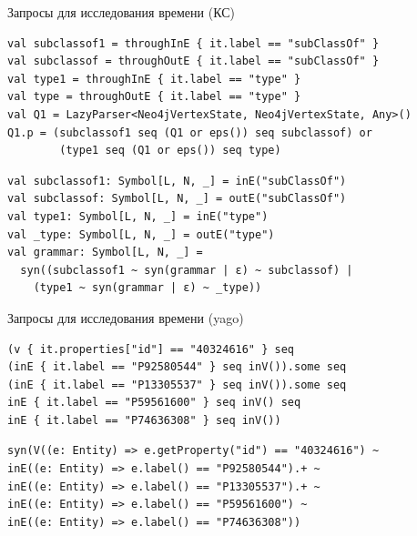\documentclass[aspectratio=169]{beamer}
\begin{document}
\begin{frame}[fragile]{Запросы для исследования времени (КС)}
  \begin{verbatim}
val subclassof1 = throughInE { it.label == "subClassOf" }
val subclassof = throughOutE { it.label == "subClassOf" }
val type1 = throughInE { it.label == "type" }
val type = throughOutE { it.label == "type" }
val Q1 = LazyParser<Neo4jVertexState, Neo4jVertexState, Any>()
Q1.p = (subclassof1 seq (Q1 or eps()) seq subclassof) or
        (type1 seq (Q1 or eps()) seq type)
\end{verbatim}
  \begin{verbatim}
val subclassof1: Symbol[L, N, _] = inE("subClassOf")
val subclassof: Symbol[L, N, _] = outE("subClassOf")
val type1: Symbol[L, N, _] = inE("type")
val _type: Symbol[L, N, _] = outE("type")
val grammar: Symbol[L, N, _] = 
  syn((subclassof1 ~ syn(grammar | ε) ~ subclassof) |
    (type1 ~ syn(grammar | ε) ~ _type))
\end{verbatim}


\end{frame}


\begin{frame}[fragile]{Запросы для исследования времени (yago)}


  \begin{verbatim}
(v { it.properties["id"] == "40324616" } seq
(inE { it.label == "P92580544" } seq inV()).some seq
(inE { it.label == "P13305537" } seq inV()).some seq
inE { it.label == "P59561600" } seq inV() seq
inE { it.label == "P74636308" } seq inV())
\end{verbatim}

  \begin{verbatim}
syn(V((e: Entity) => e.getProperty("id") == "40324616") ~
inE((e: Entity) => e.label() == "P92580544").+ ~
inE((e: Entity) => e.label() == "P13305537").+ ~
inE((e: Entity) => e.label() == "P59561600") ~
inE((e: Entity) => e.label() == "P74636308"))
  \end{verbatim}

\end{frame}
\end{document}

